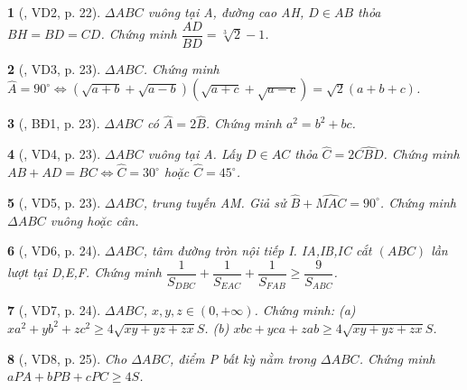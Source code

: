 \documentclass{article}
\newtheorem{baitoan}{}
\begin{document}
\begin{baitoan}[\cite{Hai_Hung_Thu_Tung2022_tap_1}, VD2, p. 22]
	$\Delta ABC$ vuông tại A, đường cao AH, $D\in AB$ thỏa $BH = BD = CD$. Chứng minh $\dfrac{AD}{BD} = \sqrt[3]{2} - 1$.
\end{baitoan}

\begin{baitoan}[\cite{Hai_Hung_Thu_Tung2022_tap_1}, VD3, p. 23]
	$\Delta ABC$. Chứng minh $\widehat{A} = 90^\circ\Leftrightarrow(\sqrt{a + b} + \sqrt{a - b})(\sqrt{a + c} + \sqrt{a - c}) = \sqrt{2}(a + b + c)$.
\end{baitoan}

\begin{baitoan}[\cite{Hai_Hung_Thu_Tung2022_tap_1}, BĐ1, p. 23]
	$\Delta ABC$ có $\widehat{A} = 2\widehat{B}$. Chứng minh $a^2 = b^2 + bc$.
\end{baitoan}

\begin{baitoan}[\cite{Hai_Hung_Thu_Tung2022_tap_1}, VD4, p. 23]
	$\Delta ABC$ vuông tại A. Lấy $D\in AC$ thỏa $\widehat{C} = 2\widehat{CBD}$. Chứng minh $AB + AD = BC\Leftrightarrow\widehat{C} = 30^\circ$ hoặc $\widehat{C} = 45^\circ$.
\end{baitoan}

\begin{baitoan}[\cite{Hai_Hung_Thu_Tung2022_tap_1}, VD5, p. 23]
	$\Delta ABC$, trung tuyến AM. Giả sử $\widehat{B} + \widehat{MAC} = 90^\circ$. Chứng minh $\Delta ABC$ vuông hoặc cân.
\end{baitoan}

\begin{baitoan}[\cite{Hai_Hung_Thu_Tung2022_tap_1}, VD6, p. 24]
	$\Delta ABC$, tâm đường tròn nội tiếp I. IA,IB,IC cắt $(ABC)$ lần lượt tại D,E,F. Chứng minh $\dfrac{1}{S_{DBC}} + \dfrac{1}{S_{EAC}} + \dfrac{1}{S_{FAB}}\ge\dfrac{9}{S_{ABC}}$.
\end{baitoan}

\begin{baitoan}[\cite{Hai_Hung_Thu_Tung2022_tap_1}, VD7, p. 24]
	$\Delta ABC$, $x,y,z\in(0,+\infty)$. Chứng minh: (a) $xa^2 + yb^2 + zc^2\ge4\sqrt{xy + yz + zx}S$. (b) $xbc + yca + zab\ge4\sqrt{xy + yz + zx}S$.
\end{baitoan}

\begin{baitoan}[\cite{Hai_Hung_Thu_Tung2022_tap_1}, VD8, p. 25]
	Cho $\Delta ABC$, điểm P bất kỳ nằm trong $\Delta ABC$. Chứng minh $aPA + bPB + cPC\ge4S$.
\end{baitoan}
\end{document}
